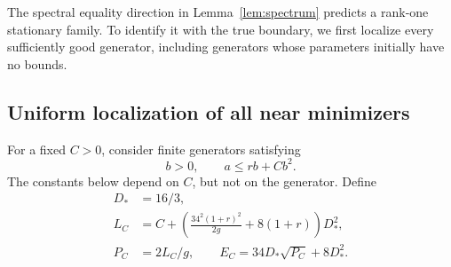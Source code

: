 \documentclass[11pt]{article}
\theoremstyle{definition}
\theoremstyle{remark}
\begin{document}
The spectral equality direction in Lemma~\ref{lem:spectrum} predicts a rank-one stationary family. To identify it with the true boundary, we first localize every sufficiently good generator, including generators whose parameters initially have no bounds.

\subsection{Uniform localization of all near minimizers}
For a fixed \(C>0\), consider finite generators satisfying
\begin{equation}\label{eq:near-class}
 b>0,\qquad a\leq rb+Cb^2.
\end{equation}
The constants below depend on \(C\), but not on the generator. Define
\begin{equation}\label{eq:localization-constants}
 \begin{aligned}
 D_*&=16/3,\\
 L_C&=C+\left(\frac{34^2(1+r)^2}{2g}+8(1+r)\right)D_*^2,\\
 P_C&=2L_C/g,\qquad E_C=34D_*\sqrt{P_C}+8D_*^2.
 \end{aligned}
\end{equation}
\end{document}
